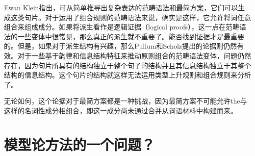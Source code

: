 Ewan Klein指出，可从简单推导出复杂表达的范畴语法\indexcgc 和最简方案，它们可以生成这类句片\citep[]{Pullum2013a}。对于运用了组合规则的范畴语法来说，确实是这样，它允许将词任意组合来组成成分。如果将派生看作是逻辑证据（logical proofs），这一点在范畴语法的一些变体中很常见，那么真正的派生就不重要了。能否找到证据才是最重要的。但是，如果对于派生结构有兴趣，那么Pullum和Scholz提出的论据则仍然有效。对于一些基于韵律和信息结构特征来推动原则组合的范畴语法变体\citep[\S~3]{Steedman91a}，问题仍然存在，因为句片所具有的结构独立于整个句子的结构并且其信息结构独立于其整个结构的信息结构。这个句片的结构就这样无法运用类型上升规则和组合规则来分析了。

无论如何，这个论据对于最简方案都是一种挑战，因为最简方案不可能允许the与这样的名词性成分相组合，即这一成分尚未通过合并从词语材料中构建而来。

\section{模型论方法的一个问题？}
\label{Abschnitt-MTS-ten-Hacken}


